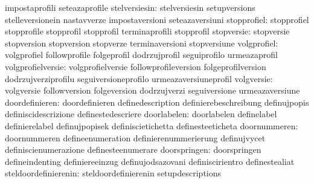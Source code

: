                                   impostaprofili                   seteazaprofile
                   stelversiesin: stelversiesin                    setupversions
                                  stelleversionein                 nastavverze
                                  impostaversioni                  seteazaversiuni
                     stopprofiel: stopprofiel                      stopprofile
                                  stopprofil                       stopprofil
                                  terminaprofili                   stopprofil
                      stopversie: stopversie                       stopversion
                                  stopversion                      stopverze
                                  terminaversioni                  stopversiune
                     volgprofiel: volgprofiel                      followprofile
                                  folgeprofil                      dodrzujprofil
                                  seguiprofilo                     urmeazaprofil
               volgprofielversie: volgprofielversie                followprofileversion
                                  folgeprofilversion               dodrzujverziprofilu
                                  seguiversioneprofilo             urmeazaversiuneprofil
                      volgversie: volgversie                       followversion
                                  folgeversion                     dodrzujverzi
                                  seguiversione                    urmeazaversiune
                  doordefinieren: doordefinieren                   definedescription
                                  definierebeschreibung            definujpopis
                                  definiscidescrizione             definestedescriere
                     doorlabelen: doorlabelen                      definelabel
                                  definierelabel                   definujpopisek
                                  definiscietichetta               definesteeticheta
                    doornummeren: doornummeren                     defineenumeration
                                  definierenummerierung            definujvycet
                                  definiscienumerazione            definesteenumerare
                    doorspringen: doorspringen                     defineindenting
                                  definiereeinzug                  definujodsazovani
                                  definiscirientro                 definestealiat
            steldoordefinierenin: steldoordefinierenin             setupdescriptions
